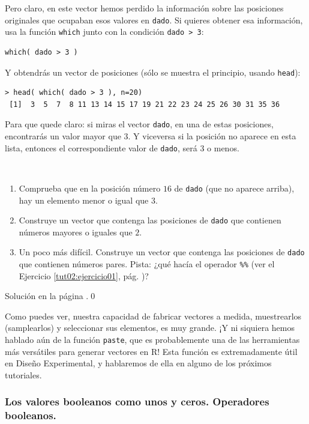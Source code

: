 \documentclass[10pt,a4paper]{article}\usepackage[]{graphicx}\usepackage[]{color}
\newcounter {cont01}
\begin{document}
Pero claro, en este vector hemos perdido la información sobre las posiciones originales que ocupaban esos valores en {\tt dado}. Si quieres obtener esa información, usa la función {\tt which} junto con la condición {\tt dado > 3}:
\begin{verbatim}
which( dado > 3 )
\end{verbatim}
Y obtendrás un vector de posiciones (sólo se muestra el principio, usando {\tt head}):
\begin{verbatim}
> head( which( dado > 3 ), n=20)
 [1]  3  5  7  8 11 13 14 15 17 19 21 22 23 24 25 26 30 31 35 36
\end{verbatim}
Para que quede claro: si miras el vector {\tt dado}, en una de estas posiciones, encontrarás un valor mayor que $3$. Y viceversa si la posición no aparece en esta lista, entonces el correspondiente valor de {\tt dado}, será $3$ o menos.
\begin{ejercicio}
\label{tut02:ejercicio25}
\quad\\
\begin{enumerate}
  \item Comprueba que en la posición número $16$ de {\tt dado} (que no aparece arriba), hay un elemento menor o igual que $3$.
  \item Construye un vector que contenga las posiciones de {\tt dado} que contienen números mayores o iguales que $2$.
  \item Un poco más difícil. Construye un vector que contenga las posiciones de {\tt dado} que contienen números pares. Pista: ¿qué hacía el operador \verb#%%# (ver el Ejercicio \ref{tut02:ejercicio01}, pág. \pageref{tut02:ejercicio01})?
\end{enumerate}
Solución en la página \pageref{tut02:ejercicio25:sol}.\qed
\end{ejercicio}

Como puedes ver, nuestra capacidad de fabricar vectores a medida, muestrearlos (samplearlos) y seleccionar sus elementos, es muy grande. ¡Y ni siquiera hemos hablado aún de la función {\tt paste}, que es probablemente una de las herramientas más versátiles para generar vectores en R! Esta función es extremadamente útil en Diseño Experimental, y hablaremos de ella en alguno de los próximos tutoriales.

\subsubsection*{Los valores booleanos como unos y ceros. Operadores booleanos.}
\label{tut02:subsubsec:BooleanosComoUnosCeros}
\end{document}
